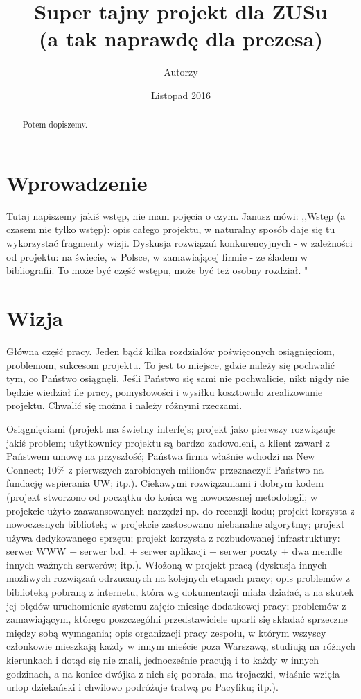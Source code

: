 \documentclass[licencjacka]{pracamgr}
\author{Autorzy}
\title{Super tajny projekt dla ZUSu\\
	(a tak naprawdę dla prezesa)}
\date{Listopad 2016}
\begin{document}
\maketitle

\begin{abstract}
  Potem dopiszemy.
\end{abstract}

\tableofcontents

\chapter*{Wprowadzenie} 
Tutaj napiszemy jakiś wstęp, nie mam pojęcia o czym. Janusz mówi: ,,Wstęp (a czasem nie tylko wstęp): opis całego projektu, w naturalny sposób daje się tu wykorzystać fragmenty wizji. Dyskusja rozwiązań konkurencyjnych - w zależności od projektu: na świecie, w Polsce, w zamawiającej firmie - ze śladem w bibliografii. To może być część wstępu, może być też osobny rozdział. "

\chapter{Wizja}\label{r:wizja}
Główna część pracy. Jeden bądź kilka rozdziałów poświęconych osiągnięciom, problemom, sukcesom projektu. To jest to miejsce, gdzie należy się pochwalić tym, co Państwo osiągnęli. Jeśli Państwo się sami nie pochwalicie, nikt nigdy nie będzie wiedział ile pracy, pomysłowości i wysiłku kosztowało zrealizowanie projektu. Chwalić się można i należy różnymi rzeczami.

Osiągnięciami (projekt ma świetny interfejs; projekt jako pierwszy rozwiązuje jakiś problem; użytkownicy projektu są bardzo zadowoleni, a klient zawarł z Państwem umowę na przyszłość; Państwa firma właśnie wchodzi na New Connect; 10\% z pierwszych zarobionych milionów przeznaczyli Państwo na fundację wspierania UW; itp.).
Ciekawymi rozwiązaniami i dobrym kodem (projekt stworzono od początku do końca wg nowoczesnej metodologii; w projekcie użyto zaawansowanych narzędzi np. do recenzji kodu; projekt korzysta z nowoczesnych bibliotek; w projekcie zastosowano niebanalne algorytmy; projekt używa dedykowanego sprzętu; projekt korzysta z rozbudowanej infrastruktury: serwer WWW + serwer b.d. + serwer aplikacji + serwer poczty + dwa mendle innych ważnych serwerów; itp.).
Włożoną w projekt pracą (dyskusja innych możliwych rozwiązań odrzucanych na kolejnych etapach pracy; opis problemów z biblioteką pobraną z internetu, która wg dokumentacji miała działać, a na skutek jej błędów uruchomienie systemu zajęło miesiąc dodatkowej pracy; problemów z zamawiającym, którego poszczególni przedstawiciele uparli się składać sprzeczne między sobą wymagania; opis organizacji pracy zespołu, w którym wszyscy członkowie mieszkają każdy w innym mieście poza Warszawą, studiują na różnych kierunkach i dotąd się nie znali, jednocześnie pracują i to każdy w innych godzinach, a na koniec dwójka z nich się pobrała, ma trojaczki, właśnie wzięła urlop dziekański i chwilowo podróżuje tratwą po Pacyfiku; itp.).
\end{document}

